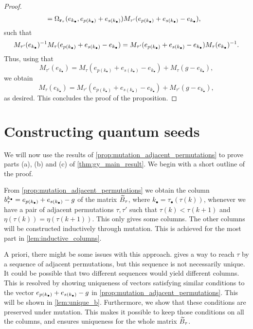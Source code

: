 \begin{proof}
\begin{align*}
		 & = \Omega_{\mathbf{r}_{\tau}}(e_{k_\bullet}, e_{p(k_\bullet)} + e_{s(k_\bullet)}) M_{\tau'}(e_{p(k_\bullet)} + e_{s(k_\bullet)} - e_{k_\bullet}),
	\end{align*}
	such that
	\begin{equation*}
		M_{\tau'}(e_{k_\bullet})^{-1} M_\tau(e_{p(k_\bullet)} + e_{s(k_\bullet)} - e_{k_\bullet}) = M_{\tau'}(e_{p(k_\bullet)} + e_{s(k_\bullet)} - e_{k_\bullet})M_\tau(e_{k_\bullet})^{-1}.
	\end{equation*}
	Thus, using that
	\begin{equation*}
		M_{\tau'}(e_{k_\bullet}) = M_{\tau}(e_{p(k_\bullet)}+e_{s(k_\bullet)}-e_{k_\bullet}) + M_{\tau}(g-e_{k_\bullet}),
	\end{equation*}
	we obtain
	\begin{equation*}
		M_{\tau}(e_{k_\bullet}) = M_{\tau'}(e_{p(k_\bullet)}+e_{s(k_\bullet)}-e_{k_\bullet}) + M_{\tau'}(g-e_{k_\bullet}),
	\end{equation*}
	as desired. This concludes the proof of the proposition.
\end{proof}

\section{Constructing quantum seeds}\label{sec:constructing_quantum_seeds}

We will now use the results of \cref{prop:mutation_adjacent_permutations} to prove
parts (a), (b) and (c) of \cref{thm:gy_main_result}. We begin with a short outline of
the proof.

From \cref{prop:mutation_adjacent_permutations} we obtain the column
$b^{k_\bullet}_{\tau} = e_{p(k_\bullet)} + e_{s(k_\bullet)} - g$ of the matrix $\widetilde{B}_\tau$, where $k_\bullet =
	\tau_\bullet(\tau(k))$, whenever we have a pair of adjacent permutations $\tau, \tau'$
such that $\tau(k) < \tau(k+1)$ and $\eta(\tau(k)) = \eta(\tau(k+1))$. This only gives
some columns. The other columns will be constructed inductively through mutation. This
is achieved for the most part in \cref{lem:inductive_columns}.

A priori, there might be some issues with this approach.
 gives a way to reach $\tau$ by a sequence of adjacent
permutations, but this sequence is not necessarily unique. It could be possible that
two different sequences would yield different columns. This is resolved by showing
uniqueness of vectors satisfying similar conditions to the vector $e_{p(k_\bullet)} + e_{s(k_\bullet)} -g$ in
\cref{prop:mutation_adjacent_permutations}. This will be shown in \cref{lem:unique_b}.
Furthermore, we show that these conditions are preserved under mutation. This makes it
possible to keep those conditions on all the columns, and ensures uniqueness for the
whole matrix $\widetilde{B}_\tau$.

